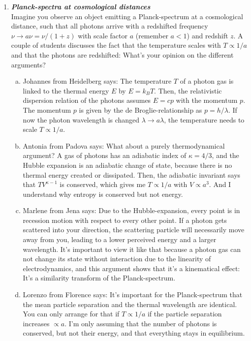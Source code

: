\documentclass[a4paper,12pt]{article}
\newcommand{\question}[1]{\textbf{\textit{#1}}}
\begin{document}
\begin{enumerate}
\item \question{Planck-spectra at cosmological distances}\\
Imagine you observe an object emitting a Planck-spectrum at a cosmological distance, such that all photons arrive with a redshifted frequency $\nu\rightarrow a\nu=\nu / (1+z)$ with scale factor $a$ (remember $a<1$) and redshift $z$. A couple of students discusses the fact that the temperature scales with $T\propto 1/a$ and that the photons are redshifted: What's your opinion on the different arguments?
\begin{enumerate}[(a)]
\item{Johannes from Heidelberg says: The temperature $T$ of a photon gas is linked to the thermal energy $E$ by $E=k_BT$. Then, the relativistic dispersion relation of the photons assumes $E = cp$ with the momentum $p$. The momentum $p$ is given by the de Broglie-relationship as $p=h/\lambda$. If now the photon wavelength is changed $\lambda\rightarrow a\lambda$, the temperature needs to scale $T\propto 1/a$.}
\item{Antonia from Padova says: What about a purely thermodynamical argument? A gas of photons has an adiabatic index of $\kappa=4/3$, and the Hubble expansion is an adiabatic change of state, because there is no thermal energy created or dissipated. Then, the adiabatic invariant says that $TV^{\kappa-1}$ is conserved, which gives me $T\propto 1/a$ with $V\propto a^3$. And I understand why entropy is conserved but not energy.}
\item{Marlene from Jena says: Due to the Hubble-expansion, every point is in recession motion with respect to every other point. If a photon gets scattered into your direction, the scattering particle will necessarily move away from you, leading to a lower perceived energy and a larger wavelength. It's important to view it like that because a photon gas can not change its state without interaction due to the linearity of electrodynamics, and this argument shows that it's a kinematical effect: It's a similarity transform of the Planck-spectrum.}
\item{Lorenzo from Florence says: It's important for the Planck-spectrum that the mean particle separation and the thermal wavelength are identical. You can only arrange for that if $T\propto 1/a$ if the particle separation increases $\propto a$. I'm only assuming that the number of photons is conserved, but not their energy, and that everything stays in equilibrium.}
\end{enumerate}


\end{enumerate}
\end{document}
